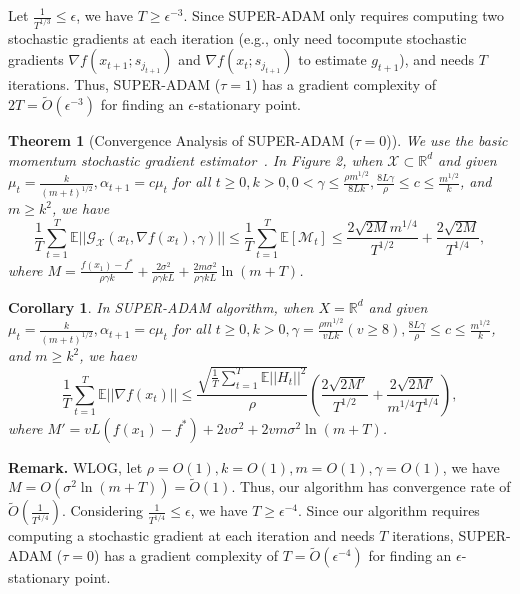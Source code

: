 \documentclass{article}
\newtheorem{theorem}{Theorem}[section]
\newtheorem{corollary}{Corollary}[section]
\begin{document}
Let $\frac{1}{T^{1/3}}\leq \epsilon$, we have $T\geq \epsilon^{-3}$. Since SUPER-ADAM only requires computing two stochastic gradients at each iteration (e.g., only need tocompute stochastic gradients $\nabla f(x_{t+1}; s_{j_{t+1}})$
and $\nabla f(x_t; s_{j_{t+1}})$ to estimate $g_{t+1}$), and needs $T$ iterations. Thus, SUPER-ADAM ($\tau = 1$) has a gradient complexity of $2T = \tilde{O}(\epsilon^{-3})$ for finding an $\epsilon$-stationary point.
\begin{theorem}[Convergence Analysis of SUPER-ADAM ($\tau = 0$)]
	We use the basic momentum stochastic gradient estimator~\cite{https://doi.org/10.48550/arxiv.1412.6980}.
	In Figure 2, when $\mathcal{X}\subset \mathbb{R}^d$ and given $\mu_t = \frac{k}{(m+t)^{1/2}}, \alpha_{t+1} = c\mu_t$ for all $t\geq 0, k > 0, 0 < \gamma \leq \frac{\rho m^{1/2}}{8Lk}, \frac{8L\gamma}{\rho}\leq c\leq \frac{m^{1/2}}{k}$,
	and $m\geq k^2$, we have
	\begin{equation}
		\frac{1}{T}\sum^T_{t=1}\mathbb{E}||\mathcal{G}_{\mathcal{X}}(x_t, \nabla f(x_t), \gamma)||\leq
		\frac{1}{T}\sum^T_{t=1}\mathbb{E}[\mathcal{M}_t]\leq
		\frac{2\sqrt{2M}m^{1/4}}{T^{1/2}} + \frac{2\sqrt{2M}}{T^{1/4}},
	\end{equation}
	where $M = \frac{f(x_1) - f^*}{\rho\gamma k} + \frac{2\sigma^2}{\rho\gamma kL} + \frac{2m\sigma^2}{\rho\gamma kL}\ln(m+T)$.
\end{theorem}
\begin{corollary}
	In SUPER-ADAM algorithm, when $X=\mathbb{R}^d$ and given $\mu_t = \frac{k}{(m+t)^{1/2}}, \alpha_{t+1} = c\mu_t$ for all $t\geq 0, k > 0, \gamma = \frac{\rho m^{1/2}}{vLk}(v\geq 8), \frac{8L\gamma}{\rho}\leq c \leq \frac{m^{1/2}}{k}$, and $m\geq k^2$, we haev
	\begin{equation}
		\frac{1}{T}\sum^T_{t=1}\mathbb{E}||\nabla f(x_t)||\leq
		\frac{\sqrt{\frac{1}{T}\sum^T_{t=1}\mathbb{E}||H_t||^2}}{\rho}
		\left(\frac{2\sqrt{2M'}}{T^{1/2}} + \frac{2\sqrt{2M'}}{m^{1/4}T^{1/4}}\right),
	\end{equation}
	where $M'=vL(f(x_1) - f^*) + 2v\sigma^2 + 2vm\sigma^2 \ln(m+T)$.
\end{corollary}
\textbf{Remark.} WLOG, let $\rho = O(1), k = O(1), m = O(1), \gamma = O(1)$, we have $M = O(\sigma^2 \ln(m+T)) = \tilde{O}(1)$. Thus, our algorithm has convergence rate of $\tilde{O}\left(\frac{1}{T^{1/4}}\right)$.
Considering $\frac{1}{T^{1/4}}\leq\epsilon$, we have $T\geq\epsilon^{-4}$. Since our algorithm requires computing a stochastic gradient at each iteration and needs $T$ iterations, SUPER-ADAM ($\tau = 0$) has a gradient complexity of $T = \tilde{O}(\epsilon^{-4})$ for finding an
$\epsilon$-stationary point.
\end{document}
